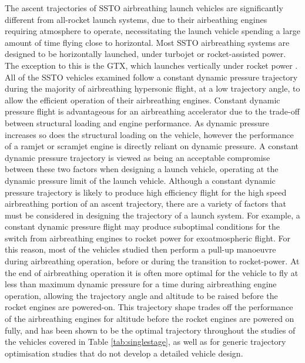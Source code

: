 The ascent trajectories of SSTO airbreathing launch vehicles are significantly different from all-rocket launch systems, due to their airbeathing engines requiring atmosphere to operate, necessitating the launch vehicle spending a large amount of time flying close to horizontal.
Most SSTO airbreathing systems are designed to be horizontally launched, under turbojet or rocket-assisted power. The exception to this is the GTX, which launches vertically under rocket power\cite{Roche2000,Trefny1999} . 
All of the SSTO vehicles examined follow a constant dynamic pressure trajectory during the majority of airbreathing hypersonic flight, at a low trajectory angle, to allow the efficient operation of their airbreathing engines. 
Constant dynamic pressure flight is advantageous for an airbreathing accelerator due to the trade-off between structural loading and engine performance\cite{Olds1998}. As dynamic pressure increases so does the structural loading on the vehicle, however the performance of a ramjet or scramjet engine is directly reliant on dynamic pressure\cite{Olds1998}. A constant dynamic pressure trajectory is viewed as being an acceptable compromise between these two factors when designing a launch vehicle, operating at the dynamic pressure limit of the launch vehicle. 
Although a constant dynamic pressure trajectory is likely to produce high efficiency flight for the high speed airbreathing portion of an ascent trajectory, there are a variety of factors that must be considered in designing the trajectory of a launch system. 
For example, a constant dynamic pressure flight may produce suboptimal conditions for the switch from airbreathing engines to rocket power for exoatmospheric flight. For this reason, most of the vehicles studied then perform a pull-up manoeuvre during airbreathing operation, before or during the transition to rocket-power. 
At the end of airbreathing operation it is often more optimal for the vehicle to fly at less than maximum dynamic pressure for a time during airbreathing engine operation, allowing the trajectory angle and altitude to be raised before the rocket engines are powered-on. 
This trajectory shape trades off the performance of the airbreathing engines for altitude before the rocket engines are powered on fully, and has been shown to be the optimal trajectory throughout the studies of the vehicles covered in Table \ref{tab:singlestage}\cite{Argus,Powell1991,Trefny1999,Roche2000,Pescetelli2012,Young2006,Bradford2000,Hyperion}, as well as for generic trajectory optimisation studies that do not develop a detailed vehicle design\cite{Pescetelli2012,Mooij,Lu1993}.
